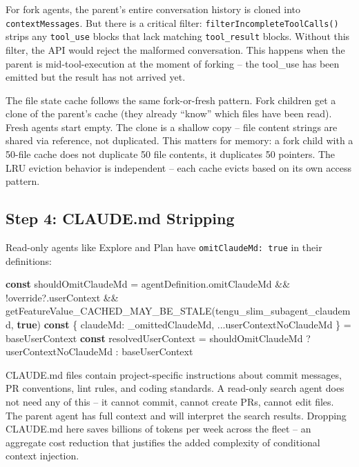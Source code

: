 \documentclass[
  english,
  11pt,
  letterpaper,
]{book}
\newenvironment{Shaded}{\begin{snugshade}}{\end{snugshade}}
\newcommand{\AttributeTok}[1]{\textcolor[rgb]{0.40,0.45,0.13}{#1}}
\newcommand{\FunctionTok}[1]{\textcolor[rgb]{0.28,0.35,0.67}{#1}}
\newcommand{\KeywordTok}[1]{\textcolor[rgb]{0.00,0.23,0.31}{\textbf{#1}}}
\newcommand{\NormalTok}[1]{\textcolor[rgb]{0.00,0.23,0.31}{#1}}
\newcommand{\OperatorTok}[1]{\textcolor[rgb]{0.37,0.37,0.37}{#1}}
\newcommand{\StringTok}[1]{\textcolor[rgb]{0.13,0.47,0.30}{#1}}
\begin{document}
For fork agents, the parent's entire conversation history is cloned into
\texttt{contextMessages}. But there is a critical filter:
\texttt{filterIncompleteToolCalls()} strips any \texttt{tool\_use}
blocks that lack matching \texttt{tool\_result} blocks. Without this
filter, the API would reject the malformed conversation. This happens
when the parent is mid-tool-execution at the moment of forking -- the
tool\_use has been emitted but the result has not arrived yet.

The file state cache follows the same fork-or-fresh pattern. Fork
children get a clone of the parent's cache (they already ``know'' which
files have been read). Fresh agents start empty. The clone is a shallow
copy -- file content strings are shared via reference, not duplicated.
This matters for memory: a fork child with a 50-file cache does not
duplicate 50 file contents, it duplicates 50 pointers. The LRU eviction
behavior is independent -- each cache evicts based on its own access
pattern.

\subsection{Step 4: CLAUDE.md
Stripping}\label{step-4-claude.md-stripping}

Read-only agents like Explore and Plan have \texttt{omitClaudeMd:\ true}
in their definitions:

\begin{Shaded}
\begin{Highlighting}[]
\KeywordTok{const}\NormalTok{ shouldOmitClaudeMd }\OperatorTok{=}
\NormalTok{  agentDefinition}\OperatorTok{.}\AttributeTok{omitClaudeMd} \OperatorTok{\&\&}
  \OperatorTok{!}\NormalTok{override}\OperatorTok{?.}\AttributeTok{userContext} \OperatorTok{\&\&}
  \FunctionTok{getFeatureValue\_CACHED\_MAY\_BE\_STALE}\NormalTok{(}\StringTok{\textquotesingle{}tengu\_slim\_subagent\_claudemd\textquotesingle{}}\OperatorTok{,} \KeywordTok{true}\NormalTok{)}
\KeywordTok{const}\NormalTok{ \{ claudeMd}\OperatorTok{:}\NormalTok{ \_omittedClaudeMd}\OperatorTok{,} \OperatorTok{...}\NormalTok{userContextNoClaudeMd \} }\OperatorTok{=}\NormalTok{ baseUserContext}
\KeywordTok{const}\NormalTok{ resolvedUserContext }\OperatorTok{=}\NormalTok{ shouldOmitClaudeMd}
  \OperatorTok{?}\NormalTok{ userContextNoClaudeMd}
  \OperatorTok{:}\NormalTok{ baseUserContext}
\end{Highlighting}
\end{Shaded}

CLAUDE.md files contain project-specific instructions about commit
messages, PR conventions, lint rules, and coding standards. A read-only
search agent does not need any of this -- it cannot commit, cannot
create PRs, cannot edit files. The parent agent has full context and
will interpret the search results. Dropping CLAUDE.md here saves
billions of tokens per week across the fleet -- an aggregate cost
reduction that justifies the added complexity of conditional context
injection.
\end{document}
